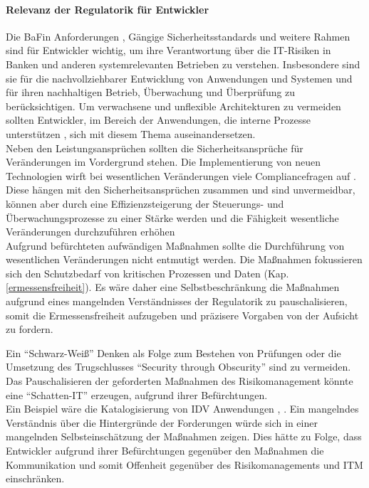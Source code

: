 \paragraph{Relevanz der Regulatorik für Entwickler}
Die BaFin Anforderungen \cite{MaRisk:2017, BAIT:2018}, Gängige Sicherheitsstandards \cite{IT-Grundschutz:2020, Disterer2013} und weitere Rahmen sind für Entwickler wichtig, um ihre Verantwortung über die IT-Risiken in Banken und anderen systemrelevanten Betrieben zu verstehen. Insbesondere sind sie für die nachvollziehbarer Entwicklung von Anwendungen und Systemen und für ihren nachhaltigen Betrieb, Überwachung und Überprüfung zu berücksichtigen. Um verwachsene und unflexible Architekturen zu vermeiden sollten Entwickler, im Bereich der Anwendungen, die interne Prozesse unterstützen \cite{Bussmann2006}, sich mit diesem Thema auseinandersetzen.
\medskip
\\
Neben den Leistungsansprüchen sollten die Sicherheitsansprüche für Veränderungen im Vordergrund stehen. Die Implementierung von neuen Technologien wirft bei wesentlichen Veränderungen viele Compliancefragen auf \cite{MaRisk:2017}. Diese hängen mit den Sicherheitsansprüchen zusammen und sind unvermeidbar, können aber durch eine Effizienzsteigerung der Steuerungs- und Überwachungsprozesse zu einer Stärke werden und die Fähigkeit wesentliche Veränderungen durchzuführen erhöhen
\medskip
\\
Aufgrund befürchteten aufwändigen Maßnahmen sollte die Durchführung von wesentlichen Veränderungen nicht entmutigt werden. Die Maßnahmen fokussieren sich den Schutzbedarf von kritischen Prozessen und Daten (Kap. \ref{ermessensfreiheit}). Es wäre daher eine Selbstbeschränkung die Maßnahmen aufgrund eines mangelnden Verständnisses der Regulatorik zu pauschalisieren, somit die Ermessensfreiheit aufzugeben und präzisere Vorgaben von der Aufsicht zu fordern.

Ein \enquote{Schwarz-Weiß} Denken als Folge zum Bestehen von Prüfungen oder die Umsetzung des Trugschlusses \enquote{Security through Obscurity} sind zu vermeiden. Das Pauschalisieren der geforderten Maßnahmen des Risikomanagement könnte eine \enquote{Schatten-IT} \cite[S. 104]{Dorschel2018} erzeugen, aufgrund ihrer Befürchtungen. 
\medskip
\\
Ein Beispiel wäre die Katalogisierung von \ac{IDV} Anwendungen \cite{BAIT:2018}, \cite[Kap. 6.8]{Dorschel2018}. Ein mangelndes Verständnis über die Hintergründe der Forderungen würde sich in einer mangelnden Selbsteinschätzung der Maßnahmen zeigen. Dies hätte zu Folge, dass Entwickler aufgrund ihrer Befürchtungen gegenüber den Maßnahmen die Kommunikation und somit Offenheit gegenüber des Risikomanagements und \ac{ITM} einschränken.
%
